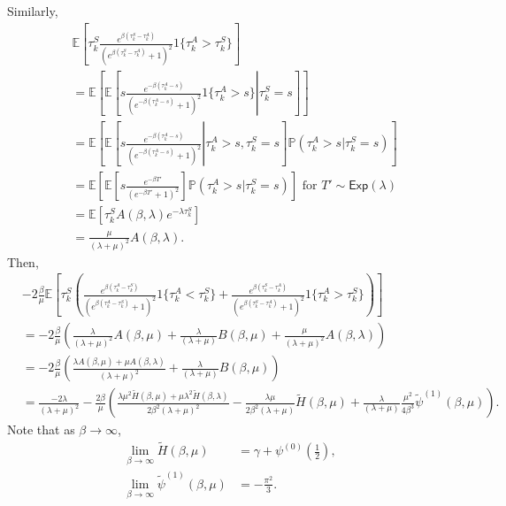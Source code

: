 Similarly,
\begin{align*}
 & \mathbb{E}\left[\tau_k^S\frac{e^{\beta(\tau_k^S-\tau_k^A)}}{(e^{\beta(\tau_k^S-\tau_k^A)}+1)^{2}}1\{\tau_k^A>\tau_k^S\}\right]\\
 & =\mathbb{E}\left[\mathbb{E}\left[\left.s\frac{e^{-\beta(\tau_k^A-s)}}{(e^{-\beta(\tau_k^A-s)}+1)^{2}}1\{\tau_k^A>s\}\right|\tau_k^S=s\right]\right]\\
 & =\mathbb{E}\left[\mathbb{E}\left[\left.s\frac{e^{-\beta(\tau_k^A-s)}}{(e^{-\beta(\tau_k^A-s)}+1)^{2}}\right|\tau_k^A>s,\tau_k^S=s\right]\mathbb{P}(\tau_k^A>s|\tau_k^S=s)\right]\\
 & =\mathbb{E}\left[\mathbb{E}\left[s\frac{e^{-\beta T'}}{(e^{-\beta T'}+1)^{2}}\right]\mathbb{P}(\tau_k^A>s|\tau_k^S=s)\right] \mbox{ for $T'\sim \mathsf{Exp}(\lambda)$}\\
 & =\mathbb{E}\left[\tau_k^S A(\beta,\lambda)e^{-\lambda \tau_k^S}\right]\\
 & =\frac{\mu}{(\lambda+\mu)^{2}} A(\beta,\lambda).
\end{align*}
Then,
\begin{align*}
 &-2\frac{\beta}{\mu}\mathbb{E}\left[\tau_k^S\left(\frac{e^{\beta(\tau_k^A-\tau_k^S)}}{(e^{\beta(\tau_k^A-\tau_k^S)}+1)^{2}}1\{\tau_k^A<\tau_k^S\}+\frac{e^{\beta(\tau_k^S-\tau_k^A)}}{(e^{\beta(\tau_k^S-\tau_k^A)}+1)^{2}}1\{\tau_k^A>\tau_k^S\}\right)\right]\\
 & =-2\frac{\beta}{\mu}\left(\frac{\lambda}{(\lambda+\mu)^{2}}A(\beta,\mu)+\frac{\lambda}{(\lambda+\mu)}B(\beta,\mu)+\frac{\mu}{(\lambda+\mu)^{2}}A(\beta,\lambda)\right)\\
 & =-2\frac{\beta}{\mu}\left(\frac{\lambda A(\beta,\mu)+\mu A(\beta,\lambda)}{(\lambda+\mu)^{2}}+\frac{\lambda}{(\lambda+\mu)}B(\beta,\mu)\right)\\
 & =\frac{-2\lambda}{(\lambda+\mu)^{2}}-\frac{2\beta}{\mu}\left(\frac{\lambda\mu^{2}\tilde{H}(\beta,\mu)+\mu\lambda^{2}\tilde{H}(\beta,\lambda)}{2\beta^{2}(\lambda+\mu)^{2}}-\frac{\lambda\mu}{2\beta^{2}(\lambda+\mu)}\tilde{H}(\beta,\mu)+\frac{\lambda}{(\lambda+\mu)}\frac{\mu^{2}}{4\beta^{3}}\tilde{\psi}^{(1)}(\beta,\mu)\right).
\end{align*}
Note that as $\beta\to\infty$,
\begin{align*}
\lim_{\beta\to\infty}\tilde{H}(\beta,\mu) & =\gamma+\psi^{(0)}\left(\frac{1}{2}\right),\\
\lim_{\beta\to\infty}\tilde{\psi}^{(1)}(\beta,\mu) & =-\frac{\pi^{2}}{3}.
\end{align*}
